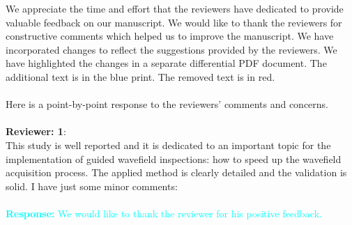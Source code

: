 \documentclass[11pt,a2paper]{report}
\begin{document}
	
	\noindent We appreciate the time and effort that the reviewers have dedicated to provide valuable feedback on our manuscript. 
	We would like to thank the reviewers for constructive comments which helped us to improve the manuscript. 
	We have incorporated changes to reflect the suggestions provided by the reviewers. 
	We have highlighted the changes in a separate differential PDF document. 
	The additional text is in the blue print. 
	The removed text is in red. \\ \\
	Here is a point-by-point response to the reviewers’ comments and concerns.
	\\ \\
	
	\textbf{Reviewer: 1}: \\
	This study is well reported and it is dedicated to an important topic for the implementation of guided wavefield inspections: how to speed up the wavefield acquisition process.
	The applied method is clearly detailed and the validation is solid.
	I have just some minor comments: \\ \\
	\textcolor{Cyan}{
		\textbf{Response:}
	We would like to thank the reviewer for his positive feedback.
    }
\end{document}
